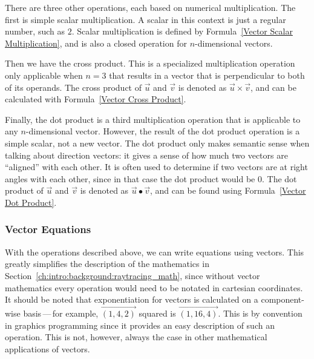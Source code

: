 There are three other operations, each based on numerical multiplication.
The first is simple scalar multiplication.
A scalar in this context is just a regular number, such as $2$.
Scalar multiplication is defined by Formula~\ref{Vector Scalar Multiplication}, and is also a closed operation for $n$-dimensional vectors.


Then we have the cross product.
This is a specialized multiplication operation only applicable when $n = 3$ that results in a vector that is perpendicular to both of its operands.
The cross product of $\vec{u}$ and $\vec{v}$ is denoted as $\vec{u} \times \vec{v}$, and can be calculated with Formula~\ref{Vector Cross Product}.


Finally, the dot product is a third multiplication operation that is applicable to any $n$-dimensional vector.
However, the result of the dot product operation is a simple scalar, not a new vector.
The dot product only makes semantic sense when talking about direction vectors: it gives a sense of how much two vectors are ``aligned'' with each other.
It is often used to determine if two vectors are at right angles with each other, since in that case the dot product would be $0$.
The dot product of $\vec{u}$ and $\vec{v}$ is denoted as $\vec{u} \bullet \vec{v}$, and can be found using Formula~\ref{Vector Dot Product}.


\subsubsection{Vector Equations}

With the operations described above, we can write equations using vectors.
This greatly simplifies the description of the mathematics in Section~\ref{ch:intro:background:raytracing_math}, since without vector mathematics every operation would need to be notated in cartesian coordinates.
It should be noted that exponentiation for vectors is calculated on a component-wise basis\,---\,for example, $\vec{(1, 4, 2)}$ squared is $\vec{(1, 16, 4)}$.
This is by convention in graphics programming since it provides an easy description of such an operation.
This is not, however, always the case in other mathematical applications of vectors.

